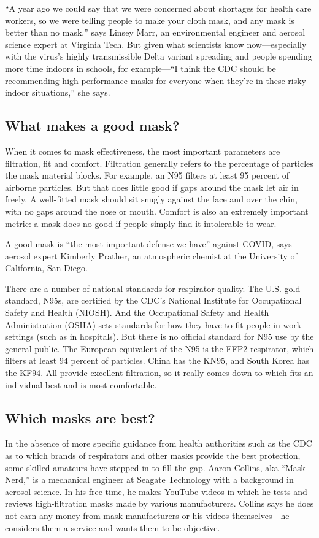 \documentclass[a4paper, 14pt]{extarticle}
\begin{document}
“A year ago we could say that we were concerned about shortages for health care workers, so we were telling people to make your cloth mask, and any mask is better than no mask,” says Linsey Marr, an environmental engineer and aerosol science expert at Virginia Tech. But given what scientists know now—especially with the virus’s highly transmissible Delta variant spreading and people spending more time indoors in schools, for example—“I think the CDC should be recommending high-performance masks for everyone when they’re in these risky indoor situations,” she says.

\subsection*{What makes a good mask?}
When it comes to mask effectiveness, the most important parameters are filtration, fit and comfort. Filtration generally refers to the percentage of particles the mask material blocks. For example, an N95 filters at least 95 percent of airborne particles. But that does little good if gaps around the mask let air in freely. A well-fitted mask should sit snugly against the face and over the chin, with no gaps around the nose or mouth. Comfort is also an extremely important metric: a mask does no good if people simply find it intolerable to wear.

A good mask is “the most important defense we have” against COVID, says aerosol expert Kimberly Prather, an atmospheric chemist at the University of California, San Diego.

There are a number of national standards for respirator quality. The U.S. gold standard, N95s, are certified by the CDC’s National Institute for Occupational Safety and Health (NIOSH). And the Occupational Safety and Health Administration (OSHA) sets standards for how they have to fit people in work settings (such as in hospitals). But there is no official standard for N95 use by the general public. The European equivalent of the N95 is the FFP2 respirator, which filters at least 94 percent of particles. China has the KN95, and South Korea has the KF94. All provide excellent filtration, so it really comes down to which fits an individual best and is most comfortable.

\subsection*{Which masks are best?}
In the absence of more specific guidance from health authorities such as the CDC as to which brands of respirators and other masks provide the best protection, some skilled amateurs have  stepped in to fill the gap. Aaron Collins, aka “Mask Nerd,” is a mechanical engineer at Seagate Technology with a background in aerosol science. In his free time, he makes YouTube videos in which he tests and reviews high-filtration masks made by various manufacturers. Collins says he does not earn any money from mask manufacturers or his videos themselves—he considers them a service and wants them to be objective.
\end{document}
